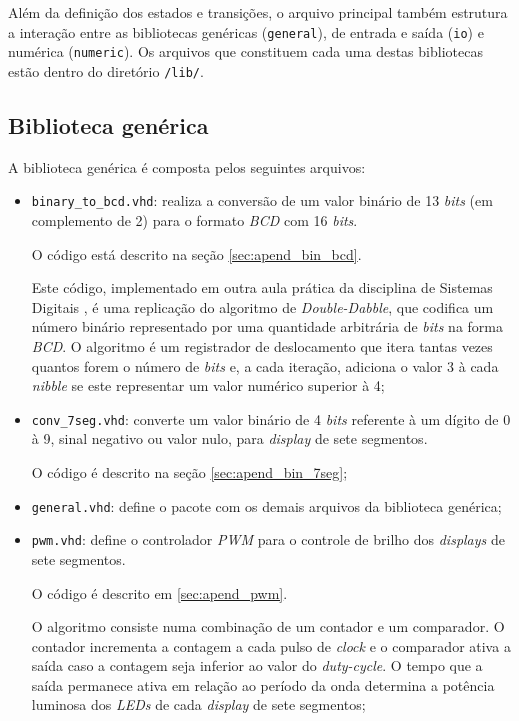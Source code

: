 \documentclass[a4paper,11pt]{article}
\begin{document}
Além da definição dos estados e transições, o arquivo principal também estrutura a interação entre as bibliotecas genéricas (\texttt{general}), de entrada e saída (\texttt{io}) e numérica (\texttt{numeric}). Os arquivos que constituem cada uma destas bibliotecas estão dentro do diretório \texttt{/lib/}.

\subsection{Biblioteca genérica}

A biblioteca genérica é composta pelos seguintes arquivos:

\begin{itemize}
	\item \texttt{binary_to_bcd.vhd}: realiza a conversão de um valor binário de 13 \textit{bits} (em complemento de 2) para o formato \textit{BCD} com 16 \textit{bits}.
	
	O código está descrito na seção \ref{sec:apend_bin_bcd}.
	
	Este código, implementado em outra aula prática da disciplina de Sistemas Digitais \cite{bacurau_pwm_dd}, é uma replicação do algoritmo de \textit{Double-Dabble}, que codifica um número binário representado por uma quantidade arbitrária de \textit{bits} na forma \textit{BCD}. O algoritmo é um registrador de deslocamento que itera tantas vezes quantos forem o número de \textit{bits} e, a cada iteração, adiciona o valor 3 à cada \textit{nibble} se este representar um valor numérico superior à 4;
	
	\item \texttt{conv_7seg.vhd}: converte um valor binário de 4 \textit{bits} referente à um dígito de 0 à 9, sinal negativo ou valor nulo, para \textit{display} de sete segmentos.
	
	O código é descrito na seção \ref{sec:apend_bin_7seg};
	
	\item \texttt{general.vhd}: define o pacote com os demais arquivos da biblioteca genérica;

	\item \texttt{pwm.vhd}: define o controlador \textit{PWM} para o controle de brilho dos \textit{displays} de sete segmentos.
	
	O código é descrito em \ref{sec:apend_pwm}.
	
	O algoritmo consiste numa combinação de um contador e um comparador. O contador incrementa a contagem a cada pulso de \textit{clock} e o comparador ativa a saída caso a contagem seja inferior ao valor do \textit{duty-cycle}. O tempo que a saída permanece ativa em relação ao período da onda determina a potência luminosa dos \textit{LEDs} de cada \textit{display} de sete segmentos;
	

\end{itemize}
\end{document}
